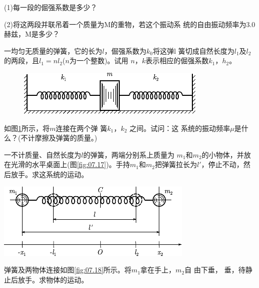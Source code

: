 \begin{exercises}
(1)每一段的倔强系数是多少？

(2)将这两段并联吊着一个质量为M的重物，若这个振动系
统的自由振动频率为3.0赫兹，M是多少？

\exercise 一均匀无质量的弹簧，它的长为$ l $，倔强系数为$ k _ { 0 } $将这弹l
簧切成自然长度为$ l _ { 1 } $及$ l _ { 2 } $的两段，且$ l _ { 1 } = n l _ { 2 } $($ n $为一个整数)。试用
$ n $，$ k $表示相应的倔强系数$ k _ { 1 } $，$ h _ { 2 } $。

\begin{figure}
    \centering
    \includegraphics{figure/fig07.16}
    \caption{}
    \label{fig:07.16}
\end{figure}
\exercise 如图\ref{fig:07.16}\;所示，将$ m $连接在两个弹
簧$ k _ { 1 } $，$ k _ { 2 } $ 之间。试问：这
系统的振动频率$ \mu $是什么？(不计摩擦及弹簧的质量。)

\exercise 一不计质量、自然长度为$ l $的弹簧，两端分别系上质量为
$ m _ { 1 } $和$ m _ { 2 } $的小物体，并放在光滑的水平桌面上(图\ref{fig:07.17})。手持$ m _ { 1 } $和$ m _ { 2 } $把弹簧拉长为$ l' $，停止不动，然后放手。求这系统的运动。
\begin{figurex}
    \centering
    \includegraphics{figure/fig07.17}
    \caption{}
    \label{fig:07.17}
\end{figurex}

\exercise 弹簧及两物体连接如图\ref{fig:07.18}\;所示。将$ m _ 1 $拿在手上，$ m _ 2 $自
由下垂，
垂，待静止后放手。求物体的运动。


\end{exercises}
